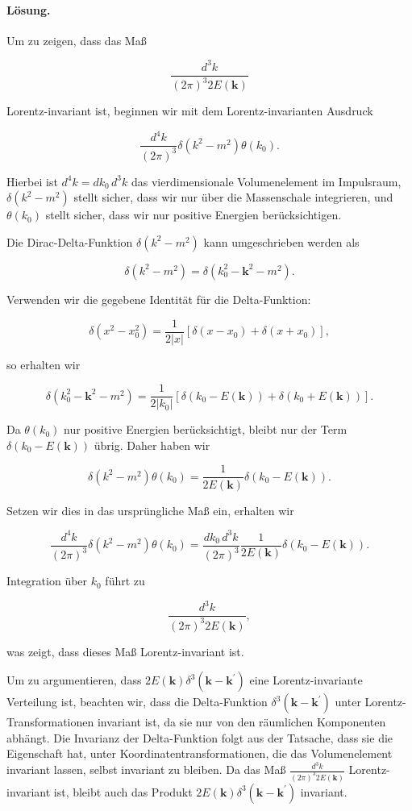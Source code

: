 \documentclass[11pt,a4paper]{article}
\begin{document}
\paragraph{Lösung.}
Um zu zeigen, dass das Maß 

\[
\frac{d^3 k}{(2 \pi)^3 2 E(\mathbf{k})}
\]

Lorentz-invariant ist, beginnen wir mit dem Lorentz-invarianten Ausdruck 

\[
\frac{d^4 k}{(2 \pi)^3} \delta\left(k^2 - m^2\right) \theta\left(k_0\right).
\]

Hierbei ist $d^4 k = dk_0 \, d^3 k$ das vierdimensionale Volumenelement im Impulsraum, $\delta\left(k^2 - m^2\right)$ stellt sicher, dass wir nur über die Massenschale integrieren, und $\theta\left(k_0\right)$ stellt sicher, dass wir nur positive Energien berücksichtigen.

Die Dirac-Delta-Funktion $\delta\left(k^2 - m^2\right)$ kann umgeschrieben werden als 

\[
\delta\left(k^2 - m^2\right) = \delta\left(k_0^2 - \mathbf{k}^2 - m^2\right).
\]

Verwenden wir die gegebene Identität für die Delta-Funktion:

\[
\delta\left(x^2 - x_0^2\right) = \frac{1}{2|x|}\left[\delta\left(x - x_0\right) + \delta\left(x + x_0\right)\right],
\]

so erhalten wir

\[
\delta\left(k_0^2 - \mathbf{k}^2 - m^2\right) = \frac{1}{2|k_0|} \left[\delta\left(k_0 - E(\mathbf{k})\right) + \delta\left(k_0 + E(\mathbf{k})\right)\right].
\]

Da $\theta(k_0)$ nur positive Energien berücksichtigt, bleibt nur der Term $\delta\left(k_0 - E(\mathbf{k})\right)$ übrig. Daher haben wir

\[
\delta\left(k^2 - m^2\right) \theta\left(k_0\right) = \frac{1}{2E(\mathbf{k})} \delta\left(k_0 - E(\mathbf{k})\right).
\]

Setzen wir dies in das ursprüngliche Maß ein, erhalten wir

\[
\frac{d^4 k}{(2 \pi)^3} \delta\left(k^2 - m^2\right) \theta\left(k_0\right) = \frac{dk_0 \, d^3 k}{(2 \pi)^3} \frac{1}{2E(\mathbf{k})} \delta\left(k_0 - E(\mathbf{k})\right).
\]

Integration über $k_0$ führt zu

\[
\frac{d^3 k}{(2 \pi)^3 2E(\mathbf{k})},
\]

was zeigt, dass dieses Maß Lorentz-invariant ist.

Um zu argumentieren, dass $2 E(\mathbf{k}) \delta^3\left(\mathbf{k} - \mathbf{k}^{\prime}\right)$ eine Lorentz-invariante Verteilung ist, beachten wir, dass die Delta-Funktion $\delta^3\left(\mathbf{k} - \mathbf{k}^{\prime}\right)$ unter Lorentz-Transformationen invariant ist, da sie nur von den räumlichen Komponenten abhängt. Die Invarianz der Delta-Funktion folgt aus der Tatsache, dass sie die Eigenschaft hat, unter Koordinatentransformationen, die das Volumenelement invariant lassen, selbst invariant zu bleiben. Da das Maß $\frac{d^3 k}{(2 \pi)^3 2 E(\mathbf{k})}$ Lorentz-invariant ist, bleibt auch das Produkt $2 E(\mathbf{k}) \delta^3\left(\mathbf{k} - \mathbf{k}^{\prime}\right)$ invariant.
\end{document}
